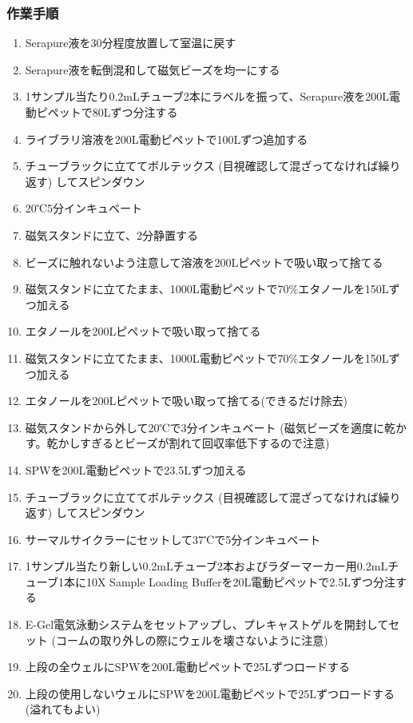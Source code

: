 \documentclass[titlepage,10pt,a4paper,uplatex]{jsbook}
\begin{document}
\subsubsection{作業手順}
\begin{enumerate}
\item Serapure液を30分程度放置して室温に戻す
\item Serapure液を転倒混和して磁気ビーズを均一にする
\item 1サンプル当たり0.2mLチューブ2本にラベルを振って、Serapure液を200{\textmu}L電動ピペットで80{\textmu}Lずつ分注する
\item ライブラリ溶液を200{\textmu}L電動ピペットで100{\textmu}Lずつ追加する
\item チューブラックに立ててボルテックス (目視確認して混ざってなければ繰り返す) してスピンダウン
\item 20℃5分インキュベート
\item 磁気スタンドに立て、2分静置する
\item ビーズに触れないよう注意して溶液を200{\textmu}Lピペットで吸い取って捨てる
\item 磁気スタンドに立てたまま、1000{\textmu}L電動ピペットで70\%エタノールを150{\textmu}Lずつ加える
\item エタノールを200{\textmu}Lピペットで吸い取って捨てる
\item 磁気スタンドに立てたまま、1000{\textmu}L電動ピペットで70\%エタノールを150{\textmu}Lずつ加える
\item エタノールを200{\textmu}Lピペットで吸い取って捨てる(できるだけ除去)
\item 磁気スタンドから外して20℃で3分インキュベート (磁気ビーズを適度に乾かす。乾かしすぎるとビーズが割れて回収率低下するので注意)
\item SPWを200{\textmu}L電動ピペットで23.5{\textmu}Lずつ加える
\item チューブラックに立ててボルテックス (目視確認して混ざってなければ繰り返す) してスピンダウン
\item サーマルサイクラーにセットして37℃で5分インキュベート
\item 1サンプル当たり新しい0.2mLチューブ2本およびラダーマーカー用0.2mLチューブ1本に10X Sample Loading Bufferを20{\textmu}L電動ピペットで2.5{\textmu}Lずつ分注する
\item E-Gel電気泳動システムをセットアップし、プレキャストゲルを開封してセット (コームの取り外しの際にウェルを壊さないように注意)
\item 上段の全ウェルにSPWを200{\textmu}L電動ピペットで25{\textmu}Lずつロードする
\item 上段の使用しないウェルにSPWを200{\textmu}L電動ピペットで25{\textmu}Lずつロードする (溢れてもよい)

\end{enumerate}
\end{document}
